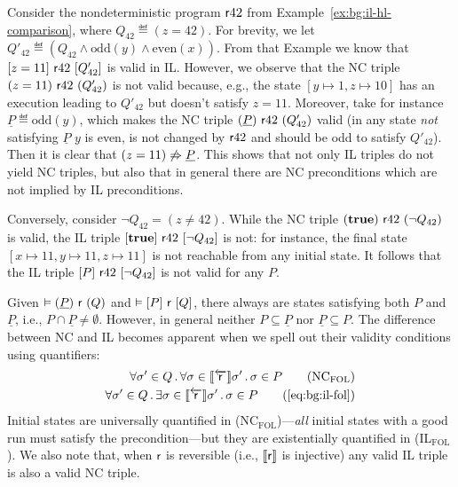 \begin{example}\label{ex:sil:nc-and-il}
	Consider the nondeterministic program $\mathsf{r} 42$ from Example~\ref{ex:bg:il-hl-comparison}, where $Q_{42} \eqdef (z = 42)$. For brevity, we let $Q'_{42} \eqdef (Q_{42} \land \text{odd}(y) \land \text{even}(x))$.
	From that Example we know that $[z = 11]~\mathsf{r} 42~[Q'_{42}]$ is valid in IL. However, we observe that the NC triple $(z = 11)~\mathsf{r} 42~(Q'_{42})$ is not valid because, e.g., the state $[y \mapsto 1, z \mapsto 10]$ has an execution leading to $Q'_{42}$ but doesn't satisfy $z = 11$.
	Moreover, take for instance $\underline{P} \eqdef \text{odd}(y)$, which makes the NC triple $(\underline{P})~\mathsf{r} 42~(Q'_{42})$ valid (in any state \emph{not} satisfying $\underline{P}$ $y$ is even, is not changed by $\mathsf{r} 42$ and should be odd to satisfy $Q'_{42}$). Then it is clear that $(z = 11) \notimplies \underline{P}$. This shows that not only IL triples do not yield NC triples, but also that in general there are NC preconditions which are not implied by IL preconditions.

	Conversely, consider $\lnot Q_{42} = (z \neq 42)$. While the NC triple $(\textbf{true})~\mathsf{r} 42~(\lnot Q_{42})$ is valid, the IL triple $[\textbf{true}]~\mathsf{r} 42~[\lnot Q_{42}]$ is not: for instance, the final state $[x \mapsto 11, y \mapsto 11, z \mapsto 11]$ is not reachable from any initial state. It follows that the IL triple $[P]~\mathsf{r} 42~[\lnot Q_{42}]$ is not valid for any $P$.
\end{example}

Given $\vDash (\underline{P})~\mathsf{r}~(Q)$ and $\vDash [P]~\mathsf{r}~[Q]$, there always are states satisfying both $P$ and $\underline{P}$, i.e., $P \cap \underline{P} \neq \emptyset$. However, in general neither $P \subseteq \underline{P}$ nor $\underline{P} \subseteq P$. The difference between NC and IL becomes apparent when we spell out their validity conditions using quantifiers:
\begin{align*}
	\forall \sigma' \in Q \sdot \forall \sigma\in \bwsem{\regr}\sigma' \sdot\sigma\in P
	\tag{NC$_{\text{FOL}}$} \\
	\forall \sigma' \in Q \sdot \exists \sigma\in \bwsem{\regr}\sigma' \sdot \sigma \in P
	\tag{\ref{eq:bg:il-fol}}
\end{align*}
Initial states are universally quantified in (NC$_{\text{FOL}}$)---\emph{all} initial states with a good run must satisfy the precondition---but they are existentially quantified in (IL$_{\text{FOL}}$). We also note that, when $\mathsf{r}$ is reversible (i.e., $\llbracket\mathsf{r}\rrbracket$ is injective) any valid IL triple is also a valid NC triple.

